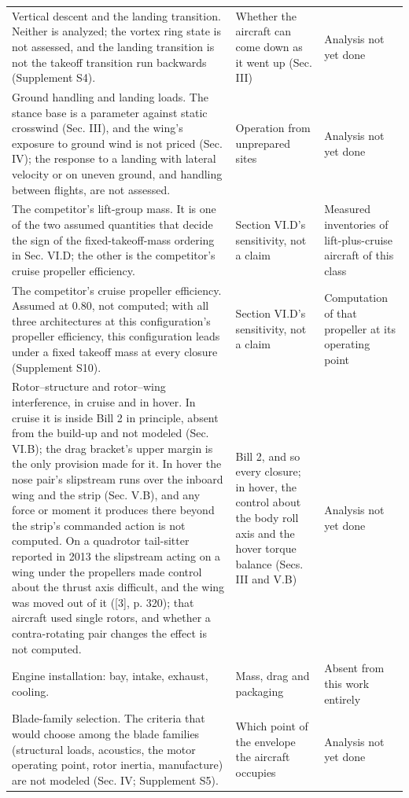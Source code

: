 \documentclass[journal]{new-aiaa}
\begin{document}
\begin{table}[htbp]
\begin{tabularx}{\linewidth}{XXX}
Vertical descent and the landing transition. Neither is analyzed; the vortex ring state is not assessed, and the landing transition is not the takeoff transition run backwards (Supplement S4). & Whether the aircraft can come down as it went up (Sec. III) & Analysis not yet done \\
Ground handling and landing loads. The stance base is a parameter against static crosswind (Sec. III), and the wing's exposure to ground wind is not priced (Sec. IV); the response to a landing with lateral velocity or on uneven ground, and handling between flights, are not assessed. & Operation from unprepared sites & Analysis not yet done \\
The competitor's lift-group mass. It is one of the two assumed quantities that decide the sign of the fixed-takeoff-mass ordering in Sec. VI.D; the other is the competitor's cruise propeller efficiency. & Section VI.D's sensitivity, not a claim & Measured inventories of lift-plus-cruise aircraft of this class \\
The competitor's cruise propeller efficiency. Assumed at 0.80, not computed; with all three architectures at this configuration's propeller efficiency, this configuration leads under a fixed takeoff mass at every closure (Supplement S10). & Section VI.D's sensitivity, not a claim & Computation of that propeller at its operating point \\
Rotor--structure and rotor--wing interference, in cruise and in hover. In cruise it is inside Bill 2 in principle, absent from the build-up and not modeled (Sec. VI.B); the drag bracket's upper margin is the only provision made for it. In hover the nose pair's slipstream runs over the inboard wing and the strip (Sec. V.B), and any force or moment it produces there beyond the strip's commanded action is not computed. On a quadrotor tail-sitter reported in 2013 the slipstream acting on a wing under the propellers made control about the thrust axis difficult, and the wing was moved out of it ([3], p. 320); that aircraft used single rotors, and whether a contra-rotating pair changes the effect is not computed. & Bill 2, and so every closure; in hover, the control about the body roll axis and the hover torque balance (Secs. III and V.B) & Analysis not yet done \\
Engine installation: bay, intake, exhaust, cooling. & Mass, drag and packaging & Absent from this work entirely \\
Blade-family selection. The criteria that would choose among the blade families (structural loads, acoustics, the motor operating point, rotor inertia, manufacture) are not modeled (Sec. IV; Supplement S5). & Which point of the envelope the aircraft occupies & Analysis not yet done \\

\end{tabularx}
\end{table}
\end{document}
